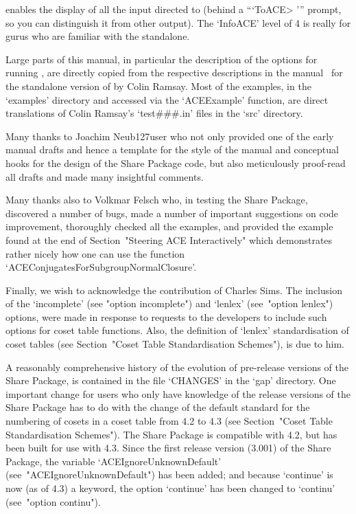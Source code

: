 enables the display of all the input  directed  to  {\ACE}  (behind  a
```ToACE> ''' prompt, so you can distinguish it  from  other  output).
The `InfoACE' level of 4 is really for gurus who are familiar with the
{\ACE} standalone.


Large parts of this manual,  in  particular  the  description  of  the
options for running {\ACE}, are directly copied  from  the  respective
descriptions in the manual~\cite{Ram99} for the standalone version  of
{\ACE} by Colin Ramsay.  Most  of  the  examples,  in  the  `examples'
directory and accessed  via  the  `ACEExample'  function,  are  direct
translations of Colin Ramsay's  `test\#\#\#.in'  files  in  the  `src'
directory.

Many thanks to Joachim Neub{\accent127u}ser who not only provided  one
of the early manual drafts and hence a template for the style  of  the
manual and conceptual hooks for the design of the Share Package  code,
but also meticulously proof-read all drafts and made  many  insightful
comments.

Many thanks also to Volkmar Felsch who, in testing  the  {\ACE}  Share
Package, discovered a number of  bugs,  made  a  number  of  important
suggestions on code improvement, thoroughly checked all the  examples,
and    provided    the    example    found    at    the     end     of
Section~"Steering ACE Interactively" which demonstrates rather  nicely
how one can use the function `ACEConjugatesForSubgroupNormalClosure'.

Finally, we wish to acknowledge the contribution of Charles Sims.  The
inclusion of the `incomplete' (see "option incomplete")  and  `lenlex'
(see~"option lenlex") options, were made in response  to  requests  to
the  {\GAP}  developers  to  include  such  options  for  coset  table
functions. Also, the definition of `lenlex' standardisation  of  coset
tables (see Section~"Coset Table Standardisation Schemes"), is due  to
him.


A reasonably comprehensive history of  the  evolution  of  pre-release
versions of the  {\ACE}  Share  Package,  is  contained  in  the  file
`CHANGES' in the `gap' directory. One important change for  users  who
only have knowledge of  the  release  versions  of  the  {\ACE}  Share
Package has to do with the change of  the  default  standard  for  the
numbering of cosets in a coset table from {\GAP}  4.2  to  {\GAP}  4.3
(see Section~"Coset Table Standardisation Schemes"). The {\ACE}  Share
Package is compatible with {\GAP} 4.2, but has been built for use with
{\GAP} 4.3. Since the first release  version  (3.001)  of  the  {\ACE}
Share     Package,     the     variable      `ACEIgnoreUnknownDefault'
(see~"ACEIgnoreUnknownDefault") has been added; and because `continue'
is now (as  of  {\GAP}  4.3)  a  {\GAP}  keyword,  the  {\ACE}  option
`continue' has been changed to `continu' (see~"option continu").

